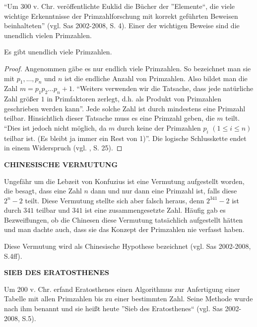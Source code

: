 ``Um 300 v. Chr. veröffentlichte Euklid die Bücher der
”Elemente“, die viele wichtige Erkenntnisse der Primzahlforschung
mit korrekt geführten Beweisen beinhalteten'' (vgl. Sas
2002-2008, S. 4). Einer der wichtigen Beweise sind die
unendlich vielen Primzahlen.

\begin{theorem}
Es gibt unendlich viele Primzahlen.
\end{theorem}
\vspace{-.7cm}

\begin{proof}
Angenommen gäbe es nur endlich viele Primzahlen.
So bezeichnet man sie mit $p_1 ,...,p_n$ und $n$
ist die endliche Anzahl von Primzahlen.
Also bildet man die Zahl $m = p_1 p_2 \dots p_n + 1$.
``Weiters verwenden wir die Tatsache, dass jede 
natürliche Zahl größer $1$ in Primfaktoren zerlegt, 
d.h. als Produkt von Primzahlen geschrieben werden kann''.
Jede solche Zahl ist durch mindestens eine Primzahl teilbar.
Hinsichtlich dieser Tatsache muss es eine Primzahl geben, 
die $m$ teilt. ``Dies ist jedoch nicht möglich, da $m$
durch keine der Primzahlen $p_i$ $(1 \leq i \leq n)$ teilbar
ist. (Es bleibt ja immer ein Rest von 1)''. Die logische
Schlusskette endet in einem Widerspruch
(vgl. \cite{schichlsteinbauer}, S. 25).
\end{proof}

\newpage


\textbf{CHINESISCHE VERMUTUNG}

Ungefähr um die Lebzeit von Konfuzius ist eine Vermutung
aufgestellt worden, die besagt, dass eine Zahl $n$ dann
und nur dann eine Primzahl ist, falls diese $2^{n} - 2$
teilt. Diese Vermutung stellte sich aber falsch heraus,
denn $2^{341} - 2$ ist durch $341$ teilbar und $341$ ist
eine zusammengesetzte Zahl. Häufig gab es Bezweiflungen,
ob die Chinesen diese Vermutung tatsächlich aufgestellt
hätten und man dachte auch, dass sie das Konzept der
Primzahlen nie verfasst haben.

Diese Vermutung wird als Chinesische Hypothese bezeichnet
(vgl. Sas 2002-2008, S.4ff). 
\vspace*{.4cm}

\textbf{SIEB DES ERATOSTHENES}

Um 200 v. Chr. erfand Eratosthenes einen Algorithmus zur
Anfertigung einer Tabelle mit allen Primzahlen bis zu
einer bestimmten Zahl. Seine Methode wurde nach ihm
benannt und sie heißt heute ''Sieb des Eratosthenes``
(vgl. Sas 2002-2008, S.5).
\vspace*{.4cm}

